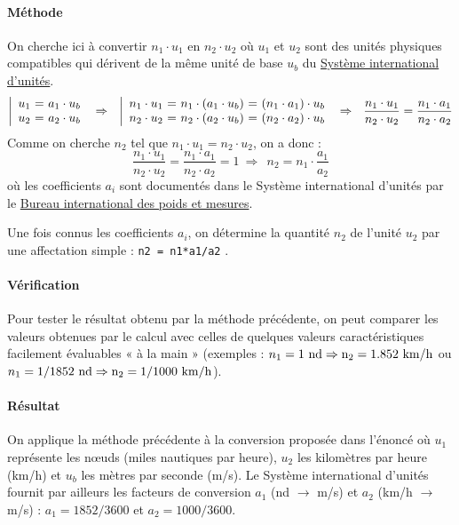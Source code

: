 \documentclass[11pt,a4paper,colorlinks,breaklinks]{article}
\begin{document}
\paragraph{Méthode}
On cherche ici à convertir $n_1\cdot u_1$ en $n_2\cdot u_2$ 
où $u_1$ et $u_2$ sont des unités physiques compatibles 
qui dérivent de la même unité de base $u_b$ du \href{http://www.bipm.org/fr/si/}{Système international d'unités}.
$$\left|\begin{array}{l@{\ =\ }r}
u_1 & a_1\cdot u_b \\
u_2 & a_2\cdot u_b
\end{array}\right.
\ \Rightarrow\ \ 
\left|\begin{array}{l@{\ =\ }r@{\ =\ }r}
n_1\cdot u_1 & n_1\cdot (a_1\cdot u_b) & (n_1\cdot a_1)\cdot u_b\\
n_2\cdot u_2 & n_2\cdot (a_2\cdot u_b) & (n_2\cdot a_2)\cdot u_b
\end{array}\right.
\ \Rightarrow\ \ \frac{n_1\cdot u_1}{n_2\cdot u_2} = \frac{n_1\cdot a_1}{n_2\cdot a_2}$$
Comme on cherche $n_2$ tel que $n_1\cdot u_1 = n_2\cdot u_2$, on a donc :
$$\frac{n_1\cdot u_1}{n_2\cdot u_2} = \frac{n_1\cdot a_1}{n_2\cdot a_2} = 1
\ \Rightarrow\ \ n_2 = n_1 \cdot \frac{a_1}{a_2}$$
où les coefficients $a_i$ sont documentés dans le Système international d'unités par le
\href{http://www.bipm.org/}{Bureau international des poids et mesures}.

Une fois connus les coefficients $a_i$, on détermine la quantité $n_2$ de l'unité $u_2$
par une affectation simple : \texttt{n2 = n1*a1/a2} .

\paragraph{Vérification}
Pour tester le résultat obtenu par la méthode précédente, 
on peut comparer les valeurs obtenues par le calcul 
avec celles de quelques valeurs caractéristiques facilement évaluables « à la main »
(exemples : $n_1 = 1\ \rm{nd} \Rightarrow{} n_2 = 1.852\ \rm{km/h}$ ou
$n_1 = 1/1852\ \rm{nd} \Rightarrow{} n_2 = 1/1000\ \rm{km/h}$).

\paragraph{Résultat} On applique la méthode précédente à la conversion
proposée dans l'énoncé où $u_1$ représente les n\oe uds (miles nautiques par heure), 
$u_2$ les kilomètres par heure (km/h) et $u_b$ les mètres par seconde (m/s).
Le Système international d'unités fournit par ailleurs les facteurs 
de conversion $a_1$ (nd $\rightarrow$ m/s) et $a_2$ (km/h $\rightarrow$ m/s) :
$a_1 = 1852/3600$ et $a_2 = 1000/3600$.
\end{document}
